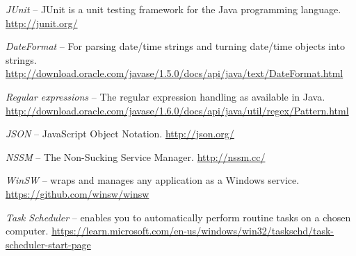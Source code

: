 \begin{thebibliography}{999}
		\textit{JUnit} -- JUnit is a unit testing framework for the Java
		programming language. \\
		\url{http://junit.org/}{}
		
		\textit{DateFormat} -- For parsing date/time strings and turning date/time
		objects into strings.
		\url{http://download.oracle.com/javase/1.5.0/docs/api/java/text/DateFormat.html}{}
		
		\textit{Regular expressions} -- The regular expression handling as available
		in Java.
		\url{http://download.oracle.com/javase/1.6.0/docs/api/java/util/regex/Pattern.html}{}

		\textit{JSON} -- JavaScript Object Notation.
		\url{http://json.org/}{}

		\textit{NSSM} -- The Non-Sucking Service Manager.
		\url{http://nssm.cc/}{}

		\textit{WinSW} -- wraps and manages any application as a Windows service.
		\url{https://github.com/winsw/winsw}{}

		\textit{Task Scheduler} -- enables you to automatically perform routine tasks on a chosen computer.
		\url{https://learn.microsoft.com/en-us/windows/win32/taskschd/task-scheduler-start-page}{}

\end{thebibliography}

